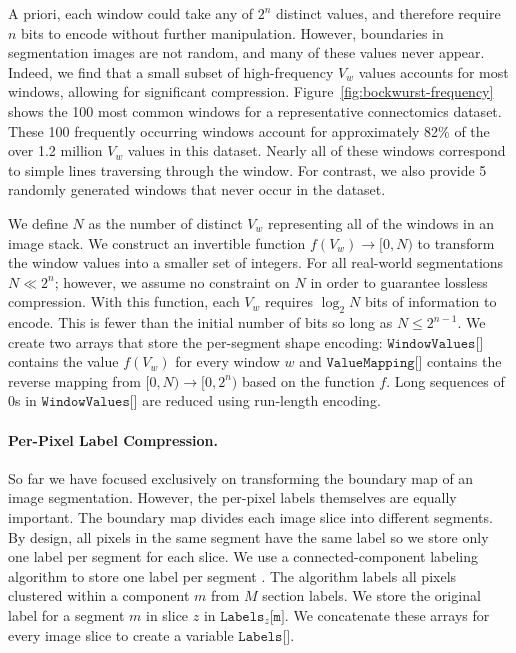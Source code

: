 A priori, each window could take any of $2^n$ distinct values, and therefore require $n$ bits to encode without further manipulation. 
However, boundaries in segmentation images are not random, and many of these values never appear. 
Indeed, we find that a small subset of high-frequency $V_w$ values accounts for most windows, allowing for significant compression. 
Figure~\ref{fig:bockwurst-frequency} shows the 100 most common windows for a representative connectomics dataset. 
These 100 frequently occurring windows account for approximately 82\% of the over 1.2 million $V_w$ values in this dataset.
Nearly all of these windows correspond to simple lines traversing through the window. 
For contrast, we also provide 5 randomly generated windows that never occur in the dataset.

We define $N$ as the number of distinct $V_w$ representing all of the windows in an image stack. 
We construct an invertible function $f(V_w) \to [0, N)$ to transform the window values into a smaller set of integers. 
For all real-world segmentations $N \ll 2^n$; however, we assume no constraint on $N$ in order to guarantee lossless compression. 
With this function, each $V_w$ requires $\log_2{N}$ bits of information to encode. 
This is fewer than the initial number of bits so long as $N \leq 2^{n - 1}$.  
We create two arrays that store the per-segment shape encoding: $\texttt{WindowValues[]}$ contains the value $f(V_w)$ for every window $w$ and $\texttt{ValueMapping[]}$ contains the reverse mapping from $[0, N) \to [0, 2^n)$ based on the function $f$. 
Long sequences of $0$s in $\texttt{WindowValues[]}$ are reduced using run-length encoding.
\paragraph{Per-Pixel Label Compression.}

So far we have focused exclusively on transforming the boundary map of an image segmentation. 
However, the per-pixel labels themselves are equally important. 
The boundary map divides each image slice into different segments. 
By design, all pixels in the same segment have the same label so we store only one label per segment for each slice. 
We use a connected-component labeling algorithm to store one label per segment \cite{he2009fast}. 
The algorithm labels all pixels clustered within a component $m$ from $M$ section labels.
We store the original label for a segment $m$ in slice $z$ in $\texttt{Labels}_z\texttt{[m]}$. 
We concatenate these arrays for every image slice to create a variable $\texttt{Labels[]}$.

